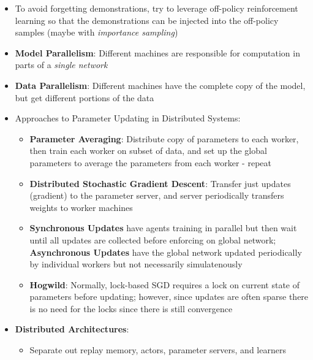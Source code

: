 \documentclass[twocolumn]{article}
\makeatletter
\providecommand{\tightlist}{%
  \setlength{\itemsep}{\GlobalItemSep}\setlength{\parskip}{\GlobalListParSkip}}
\newcommand{\SectionFontStyle}{\fontsize{6.4}{7.2}\selectfont\bfseries}
\newlength{\SectionBeforeSkip}
\newlength{\SectionAfterSkip}
\newlength{\GlobalItemSep}
\newlength{\GlobalListParSkip}
\renewcommand\section{\@startsection{section}{1}{\z@}{\SectionBeforeSkip}{\SectionAfterSkip}{\normalfont\SectionFontStyle}}
\makeatother
\begin{document}
\begin{itemize}
  \begin{itemize}
  \tightlist
  \item
    To avoid forgetting demonstrations, try to leverage off-policy
    reinforcement learning so that the demonstrations can be injected
    into the off-policy samples (maybe with \emph{importance sampling})
  \end{itemize}
\end{itemize}

\section{System Design}\label{system-design}

\begin{itemize}
\tightlist
\item
  \textbf{Model Parallelism}: Different machines are responsible for
  computation in parts of a \emph{single network}
\item
  \textbf{Data Parallelism}: Different machines have the complete copy
  of the model, but get different portions of the data
\item
  Approaches to Parameter Updating in Distributed Systems:

  \begin{itemize}
  \tightlist
  \item
    \textbf{Parameter Averaging}: Distribute copy of parameters to each
    worker, then train each worker on subset of data, and set up the
    global parameters to average the parameters from each worker -
    repeat
  \item
    \textbf{Distributed Stochastic Gradient Descent}: Transfer just
    updates (gradient) to the parameter server, and server periodically
    transfers weights to worker machines
  \item
    \textbf{Synchronous Updates} have agents training in parallel but
    then wait until all updates are collected before enforcing on global
    network; \textbf{Asynchronous Updates} have the global network
    updated periodically by individual workers but not necessarily
    simulatenously
  \item
    \textbf{Hogwild}: Normally, lock-based SGD requires a lock on
    current state of parameters before updating; however, since updates
    are often sparse there is no need for the locks since there is still
    convergence
  \end{itemize}
\item
  \textbf{Distributed Architectures}:

  \begin{itemize}
  \tightlist
  \item
    Separate out replay memory, actors, parameter servers, and learners
  \end{itemize}
\end{itemize}
\end{document}
